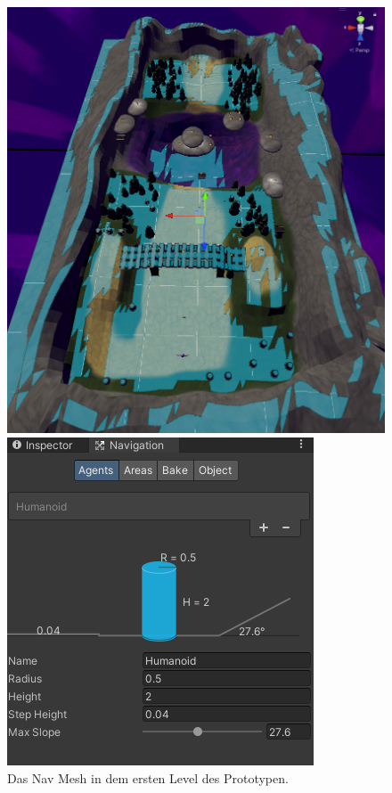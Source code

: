\begin{figure}[h]
    \centering
    \begin{minipage}[b]{0.5\textwidth}
        \centering
        \includegraphics[width=\textwidth]{chapters/05/images/NavMesh.png}
        \caption{Das Nav Mesh in dem ersten Level des Prototypen.}
        \label{fig:SD01}
    \end{minipage}
    \hfill
    \begin{minipage}[b]{0.45\textwidth}
        \centering
        \includegraphics[width=\textwidth]{chapters/05/images/Agent.png}

\end{minipage}
\end{figure}
